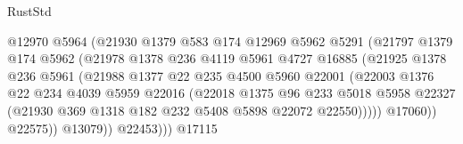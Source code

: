 \begin{lexlean}{RustStd}
\begin{coremodule}
                              @12970
                              @5964
                              (@21930
                                @1379
                                @583
                                @174
                                @12969
                                @5962
                                @5291
                                (@21797
                                  @1379
                                  @174
                                  @5962
                                  (@21978
                                    @1378
                                    @236
                                    @4119
                                    @5961
                                    @4727
                                    @16885
                                    (@21925
                                      @1378
                                      @236
                                      @5961
                                      (@21988
                                        @1377
                                        @22
                                        @235
                                        @4500
                                        @5960
                                        @22001
                                        (@22003
                                          @1376
                                          @22
                                          @234
                                          @4039
                                          @5959
                                          @22016
                                          (@22018
                                            @1375
                                            @96
                                            @233
                                            @5018
                                            @5958
                                            @22327
                                            (@21930
                                              @369
                                              @1318
                                              @182
                                              @232
                                              @5408
                                              @5898
                                              @22072
                                              @22550)))))
                                    @17060))
                                @22575))
                            @13079))
                        @22453)))
                  @17115

\end{coremodule}
\end{lexlean}
